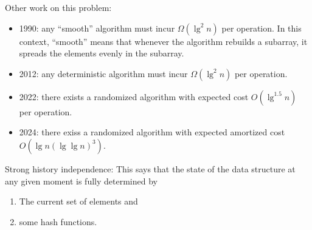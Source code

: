 \documentclass{report}
\begin{document}
\noindent Other work on this problem:
\begin{itemize}
    \item 1990: any ``smooth'' algorithm must incur $\Omega(\lg^2 n)$ per operation. In this context, ``smooth'' means that whenever the algorithm rebuilds a subarray, it spreads the elements evenly in the subarray.
    \item 2012: any deterministic algorithm must incur $\Omega(\lg^2 n)$ per operation.
    \item 2022: there exists a randomized algorithm with expected cost $O(\lg^{1.5} n)$ per operation.
    \item 2024: there exiss a randomized algorithm with expected amortized cost $O(\lg n(\lg \lg n)^3)$.
\end{itemize}
\noindent Strong history independence: This says that the state of the data structure at any given moment is fully determined by 
\begin{enumerate}
    \item The current set of elements and
    \item some hash functions.
\end{enumerate}
\end{document}
